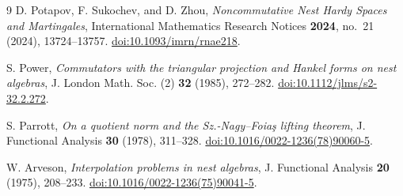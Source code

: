 \documentclass[UTF8,11pt,a4paper,fontset=fandol]{ctexart}
\theoremstyle{remark}
\numberwithin{equation}{section}
\begin{document}
\begin{thebibliography}{9}
D. Potapov, F. Sukochev, and D. Zhou,
\emph{Noncommutative Nest Hardy Spaces and Martingales},
International Mathematics Research Notices \textbf{2024}, no.~21 (2024), 13724--13757.
\href{https://doi.org/10.1093/imrn/rnae218}{doi:10.1093/imrn/rnae218}.

S. Power,
\emph{Commutators with the triangular projection and Hankel forms on nest algebras},
J. London Math. Soc. (2) \textbf{32} (1985), 272--282.
\href{https://doi.org/10.1112/jlms/s2-32.2.272}{doi:10.1112/jlms/s2-32.2.272}.

S. Parrott,
\emph{On a quotient norm and the Sz.-Nagy--Foia\c{s} lifting theorem},
J. Functional Analysis \textbf{30} (1978), 311--328.
\href{https://doi.org/10.1016/0022-1236(78)90060-5}{doi:10.1016/0022-1236(78)90060-5}.

W. Arveson,
\emph{Interpolation problems in nest algebras},
J. Functional Analysis \textbf{20} (1975), 208--233.
\href{https://doi.org/10.1016/0022-1236(75)90041-5}{doi:10.1016/0022-1236(75)90041-5}.
\end{thebibliography}
\end{document}
